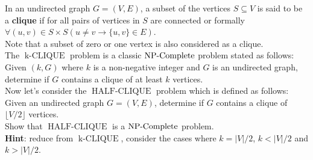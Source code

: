 \newcommand{\HC}{\operatorname{HALF-CLIQUE}}
\newcommand{\CLQ}[1]{\operatorname{{#1}-CLIQUE}}
\titledquestion{$\HC \in \NPC$}

In an undirected graph $G=(V,E)$, a subset of the vertices $S\subseteq V$ is said to be a \textbf{clique}
if for all pairs of vertices in $S$ are connected or formally $\forall (u,v)\in S\times S (u\neq v\to \{u,v\}\in E)$.\\
Note that a subset of zero or one vertex is also considered as a clique.\\

The $\CLQ{k}$ problem is a classic $\mathbf{\operatorname{NP-Complete}}$ problem stated as follows:\\
Given $(k,G)$ where $k$ is a non-negative integer and $G$ is an undirected graph,
determine if $G$ contains a clique of at least $k$ vertices.\\

Now let's consider the $\HC$ problem which is defined as follows:\\
Given an undirected graph $G=(V,E)$, determine if $G$ contains a clique of $\lfloor V/2 \rfloor$ vertices.\\
Show that $\HC$ is a $\mathbf{\operatorname{NP-Complete}}$ problem.\\

\textbf{Hint}: reduce from $\CLQ{k}$, consider the cases where $k=|V|/2$, $k<|V|/2$ and $k>|V|/2$.


